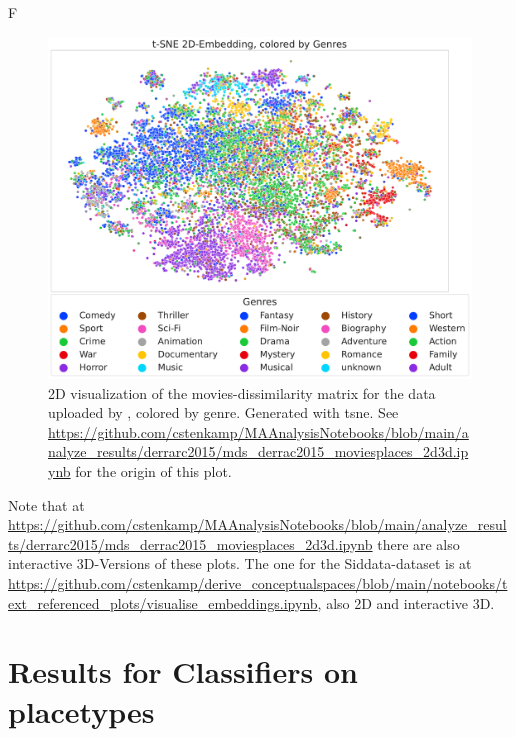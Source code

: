F
\begin{figure}[h]
	\begin{center}
	  \includegraphics[width=\textwidth]{graphics/figures/scatter_mds_tsne_movies_Genres.pdf}
	  \caption[2D visualization of the movies-dissimilarity matrix]{2D visualization of the movies-dissimilarity matrix for the data uploaded by \textcite{Derrac2015}, colored by genre. Generated with \gls{tsne}. See \url{https://github.com/cstenkamp/MAAnalysisNotebooks/blob/main/analyze_results/derrarc2015/mds_derrac2015_moviesplaces_2d3d.ipynb} for the origin of this plot.}
	  \label{fig:scatter_mds_movies}
	\end{center}
\end{figure}

Note that at \url{https://github.com/cstenkamp/MAAnalysisNotebooks/blob/main/analyze_results/derrarc2015/mds_derrac2015_moviesplaces_2d3d.ipynb} there are also interactive 3D-Versions of these plots. The one for the Siddata-dataset is at \url{https://github.com/cstenkamp/derive_conceptualspaces/blob/main/notebooks/text_referenced_plots/visualise_embeddings.ipynb}, also 2D and interactive 3D. 

\clearpage
\section{Results for Classifiers on placetypes}


